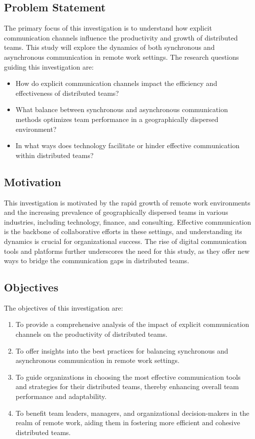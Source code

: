 \documentclass[12pt]{article}
\begin{document}
\subsection{Problem Statement}
The primary focus of this investigation is to understand how explicit communication channels influence the productivity and growth of distributed teams. This study will explore the dynamics of both synchronous and asynchronous communication in remote work settings. The research questions guiding this investigation are:
\begin{itemize}
  \item How do explicit communication channels impact the efficiency and effectiveness of distributed teams?
  \item What balance between synchronous and asynchronous communication methods optimizes team performance in a geographically dispersed environment?
  \item In what ways does technology facilitate or hinder effective communication within distributed teams?
\end{itemize}

\subsection{Motivation}
This investigation is motivated by the rapid growth of remote work environments and the increasing prevalence of geographically dispersed teams in various industries, including technology, finance, and consulting. Effective communication is the backbone of collaborative efforts in these settings, and understanding its dynamics is crucial for organizational success. The rise of digital communication tools and platforms further underscores the need for this study, as they offer new ways to bridge the communication gaps in distributed teams.

\subsection{Objectives}
The objectives of this investigation are:
\begin{enumerate}
  \item To provide a comprehensive analysis of the impact of explicit communication channels on the productivity of distributed teams.
  \item To offer insights into the best practices for balancing synchronous and asynchronous communication in remote work settings.
  \item To guide organizations in choosing the most effective communication tools and strategies for their distributed teams, thereby enhancing overall team performance and adaptability.
  \item To benefit team leaders, managers, and organizational decision-makers in the realm of remote work, aiding them in fostering more efficient and cohesive distributed teams.
\end{enumerate}
\end{document}

